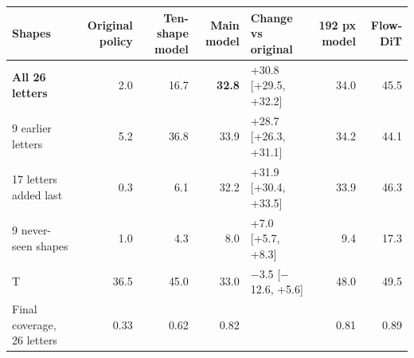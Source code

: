 \begin{tabular}{lrrrlrr}
\toprule
Shapes & Original policy & Ten-shape model & Main model & Change vs original & 192 px model & Flow-DiT \\
\midrule
\textbf{All 26 letters} & 2.0 & 16.7 & \textbf{32.8} & +30.8 [+29.5, +32.2] & 34.0 & 45.5 \\
9 earlier letters & 5.2 & 36.8 & 33.9 & +28.7 [+26.3, +31.1] & 34.2 & 44.1 \\
17 letters added last & 0.3 & 6.1 & 32.2 & +31.9 [+30.4, +33.5] & 33.9 & 46.3 \\
9 never-seen shapes & 1.0 & 4.3 & 8.0 & +7.0 [+5.7, +8.3] & 9.4 & 17.3 \\
T & 36.5 & 45.0 & 33.0 & $-$3.5 [$-$12.6, +5.6] & 48.0 & 49.5 \\
\midrule
Final coverage, 26 letters & 0.33 & 0.62 & 0.82 & & 0.81 & 0.89 \\
\bottomrule
\end{tabular}
